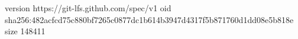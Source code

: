 version https://git-lfs.github.com/spec/v1
oid sha256:482acfcd75c880bf7265c0877dc1b614b3947d4317f5b871760d1dd08e5b818e
size 148411
